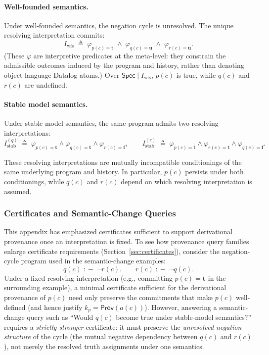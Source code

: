 \documentclass[acmsmall,nonacm]{acmart}
\theoremstyle{remark}
\numberwithin{definition}{section}
\numberwithin{theorem}{section}
\numberwithin{lemma}{section}
\numberwithin{corollary}{section}
\numberwithin{remark}{section}
\numberwithin{example}{section}
\numberwithin{observation}{section}
\numberwithin{assumption}{section}
\newcommand{\Spec}{\mathsf{Spec}}
\newcommand{\drule}{\mathrel{:\!-}}
\newcommand{\Prov}{\mathsf{Prov}}
\begin{document}
\paragraph{Well-founded semantics.}
Under well-founded semantics, the negation cycle is unresolved.
The unique resolving interpretation commits:
\[
I_{\mathrm{wfs}}
\;\triangleq\;
\varphi_{p(c)=\mathbf{t}}
\;\wedge\;
\varphi_{q(c)=\mathbf{u}}
\;\wedge\;
\varphi_{r(c)=\mathbf{u}} .
\]
(These $\varphi$ are interpretive predicates at the meta-level: they constrain the
admissible outcomes induced by the program and history, rather than denoting
object-language Datalog atoms.)
Over $\Spec \mid I_{\mathrm{wfs}}$, $p(c)$ is true, while $q(c)$ and $r(c)$ are undefined.

\paragraph{Stable model semantics.}
Under stable model semantics, the same program admits two resolving interpretations:
\[
I^{(q)}_{\mathrm{stab}}
\;\triangleq\;
\varphi_{p(c)=\mathbf{t}}
\wedge \varphi_{q(c)=\mathbf{t}}
\wedge \varphi_{r(c)=\mathbf{f}},
\qquad
I^{(r)}_{\mathrm{stab}}
\;\triangleq\;
\varphi_{p(c)=\mathbf{t}}
\wedge \varphi_{r(c)=\mathbf{t}}
\wedge \varphi_{q(c)=\mathbf{f}} .
\]

These resolving interpretations are mutually incompatible conditionings of the
same underlying program and history.
In particular, $p(c)$ persists under both conditionings, while $q(c)$ and $r(c)$
depend on which resolving interpretation is assumed.

\subsubsection{Certificates and Semantic-Change Queries}

This appendix has emphasized certificates sufficient to support derivational provenance once an interpretation is fixed. To see how provenance query families enlarge certificate requirements (Section~\ref{sec:certificates}), consider the negation-cycle program used in the semantic-change examples:
\[
  q(c) \;\drule\; \neg r(c).\qquad
  r(c) \;\drule\; \neg q(c).
\]
Under a fixed resolving interpretation (e.g., committing $p(c)=\mathbf{t}$ in the surrounding example), a minimal certificate sufficient for the derivational provenance of $p(c)$ need only preserve the commitments that make $p(c)$ well-defined (and hence justify $k_p=\Prov(a(c))$). However, answering a semantic-change query such as “Would $q(c)$ become true under stable-model semantics?” requires a \emph{strictly stronger} certificate: it must preserve the \emph{unresolved negation structure} of the cycle (the mutual negative dependency between $q(c)$ and $r(c)$), not merely the resolved truth assignments under one semantics.
\end{document}
